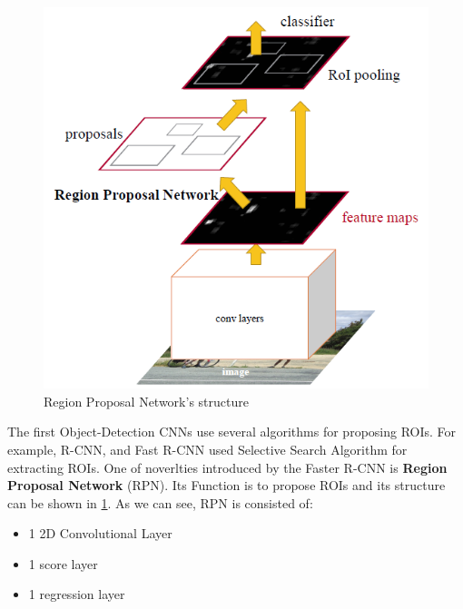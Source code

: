 \documentclass{report}
\begin{document}
\begin{figure}[h]
  \centering
  \includegraphics[scale=0.3]{RPN_structure}
  \caption{ Region Proposal Network's structure}
  \label{fig:rpn_structure}
\end{figure}

The first Object-Detection CNNs use several algorithms for proposing ROIs. For example, R-CNN\cite{DBLP:journals/corr/GirshickDDM13},
and Fast R-CNN\cite{Girshick:2015:FR:2919332.2920125} used Selective Search Algorithm for extracting ROIs.
One of noverlties introduced by the Faster R-CNN\cite{Ren:2015:FRT:2969239.2969250} is \textbf{Region Proposal Network} (RPN). Its
Function is to propose ROIs and its structure can be shown in \ref{fig:rpn_structure}. As we can see, RPN is consisted of:
\begin{itemize}
\item 1 2D Convolutional Layer
\item 1 score layer 
\item 1 regression layer
\end{itemize}
\end{document}
